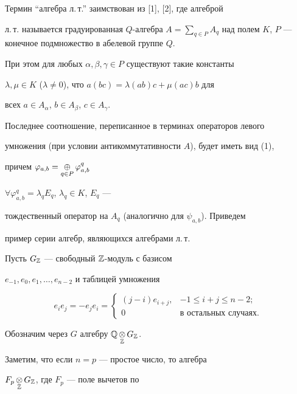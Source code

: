Термин ``алгебра л.\,т.'' заимствован из [1], [2], где алгеброй 


л.\,т. называется градуированная $Q$-алгебра $A=\sum\limits_{q\in 


P}A_q$ над полем $K$, $P$ --- конечное подмножество в абелевой группе $Q$. 


При этом для любых $\alpha,\beta,\gamma\in P$ существуют такие константы 


$\lambda,\mu\in K$ ($\lambda\ne0$), что $a(bc)=\lambda(ab)c+\mu(ac)b$ для 


всех $a\in A_\alpha$, $b\in A_\beta$, $c\in A_\gamma$.  


 


Последнее соотношение, переписанное в терминах операторов левого 


умножения (при условии антикоммутативности $A$), будет иметь вид (1), 


причем $\varphi_{a,b}=\mathop{\oplus}\limits_{q\in P} \varphi^q_{a,b}$ 


$\forall\varphi^q_{a,b}=\lambda_q E_q$, $\lambda_q\in K$, $E_q$ --- 


тождественный оператор на $A_q$ (аналогично для $\psi_{a,b}$). Приведем 


пример серии алгебр, являющихся алгебрами л.\,т.  


 


Пусть $G_{\Bbb Z}$ --- свободный $\Bbb Z$-модуль с базисом 


$e_{-1},e_0,e_1,\dotsc,e_{n-2}$ и таблицей умножения  


$$ 


e_i e_j=-e_j e_i= 


\begin{cases} 


(j-i)e_{i+j}, & -1\le i+j\le n-2;\\ 


0 & \text{в остальных случаях}. 


\end{cases} 


$$ 


 


Обозначим через $G$ алгебру $\Bbb Q\mathop{\otimes}\limits_{\Bbb Z} G_{\Bbb Z}$. 


Заметим, что если $n=p$ --- простое число, то алгебра 


$F_p\mathop{\otimes}\limits_{\Bbb Z}G_{\Bbb Z}$, где $F_p$ --- поле вычетов по 


